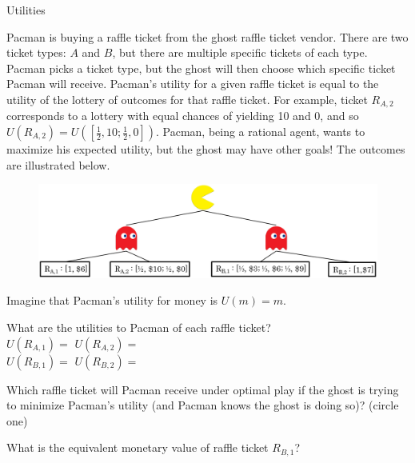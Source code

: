 \begin{problem}[12]{Utilities}

Pacman is buying a raffle ticket from the ghost raffle ticket vendor.
There are two ticket types: $A$ and $B$, but there are multiple specific tickets of each type.  Pacman picks a ticket type, but the ghost will then choose which specific ticket Pacman will receive.  Pacman's utility for a given raffle ticket is equal to the utility of the lottery of outcomes for that raffle ticket. For example, ticket $R_{A,2}$ corresponds to a lottery with equal chances of yielding 10 and 0, and so $U(R_{A,2}) = U([\frac{1}{2}, 10; \frac{1}{2}, 0])$. Pacman, being a rational agent, wants to maximize his expected utility, but the ghost may have other goals! The outcomes are illustrated below.
\begin{figure}[h]
\centering\includegraphics[scale=.5]{figures/utilities.png}
\end{figure}
\vspace{-0.4cm}

\begin{question}[5]{}
Imagine that Pacman's utility for money is $U(m) = m$.
\begin{subquestion}[2]
What are the utilities to Pacman of each raffle ticket?\\
\vspace{.2cm}
{\centering $U(R_{A, 1}) =$ \solution{}{\TwoAiUAOne} \hspace{6cm} $U(R_{A, 2}) =$ \solution{}{\TwoAiUATwo}}\\
\vspace{.2cm}
{\centering $U(R_{B, 1}) =$ \solution{}{\TwoAiUBOne} \hspace{6cm} $U(R_{B, 2}) =$ \solution{}{\TwoAiUBTwo}}\\

\end{subquestion}
\vspace{-0.5cm}
\begin{subquestion}[1]
Which raffle ticket will Pacman receive under optimal play if the ghost is trying to minimize Pacman's utility (and Pacman knows the ghost is doing so)? (circle one)\\
\TwoAii
\end{subquestion}
\begin{subquestion}[2]
What is the equivalent monetary value of raffle ticket $R_{B,1}$?\\
\end{subquestion}
\end{question}


\end{problem}
